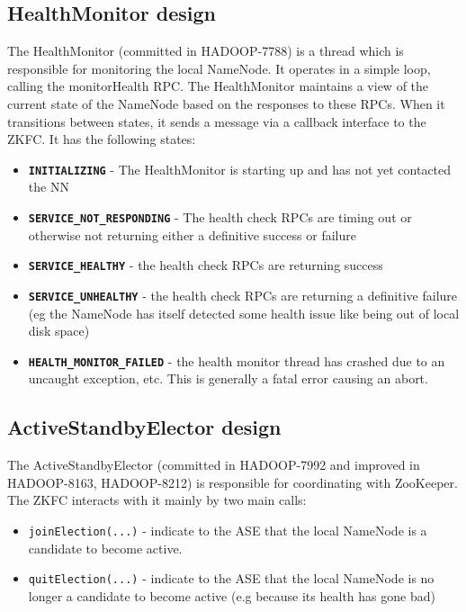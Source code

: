 \documentclass{article}
\begin{document}
\subsection{HealthMonitor design}

The HealthMonitor (committed in HADOOP-7788) is a thread which is responsible for monitoring the local NameNode. It operates in a simple loop, calling the {{monitorHealth}} RPC. The HealthMonitor maintains a view of the current state of the NameNode based on the responses to these RPCs. When it transitions between states, it sends a message via a callback interface to the ZKFC. It has the following states:

\begin{itemize}
\item {\bf \tt INITIALIZING} - The HealthMonitor is starting up and has not yet contacted the NN
\item {\bf \tt SERVICE\_NOT\_RESPONDING} - The health check RPCs are timing out or otherwise not returning either a definitive success or failure
\item {\bf \tt SERVICE\_HEALTHY} - the health check RPCs are returning success
\item {\bf \tt SERVICE\_UNHEALTHY} - the health check RPCs are returning a definitive failure (eg the NameNode has itself detected some health issue like being out of local disk space)
\item {\bf \tt HEALTH\_MONITOR\_FAILED} - the health monitor thread has crashed due to an uncaught exception, etc. This is generally a fatal error causing an abort.
\end{itemize}

\subsection{ActiveStandbyElector design}

The ActiveStandbyElector (committed in HADOOP-7992 and improved in HADOOP-8163, HADOOP-8212) is responsible for coordinating with ZooKeeper. The ZKFC interacts with it mainly by two main calls:
\begin{itemize}
\item {\tt joinElection(...)} - indicate to the ASE that the local NameNode is a candidate to become active.
\item {\tt quitElection(...)} - indicate to the ASE that the local NameNode is no longer a candidate to become active (e.g because its health has gone bad)
\end{itemize}
\end{document}
